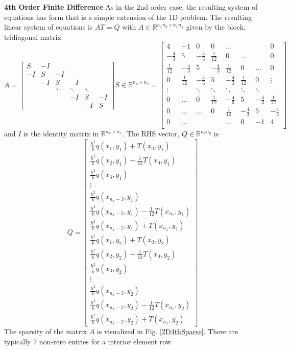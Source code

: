 \documentclass[letterpaper,12pt]{article}
\begin{document}
\textbf{4th Order Finite Difference} As in the 2nd order case, the resulting system of equations has form that is a simple extension of the 1D problem.
The resulting linear system of equations is $AT = Q$ with $A \in \mathbb{R}^{n_xn_y \times n_xn_y}$ given by the block, tridiagonal matrix
\[
A = 
\begin{bmatrix}
S & -I & &\\
-I & S & -I & \\
 & -I & S & -I \\
 & & \ddots & \ddots & \ddots \\
 & & & -I & S & -I \\
 & & & & -I & S
\end{bmatrix}
S \in \mathbb{R}^{n_x \times n_x} =
\begin{bmatrix}
4 & -1 & 0 & 0 & \dots & & & 0 \\
-\frac{4}{3} & 5 & -\frac{4}{3} & \frac{1}{12} & 0 & \dots & & 0\\
\frac{1}{12} & -\frac{4}{3} & 5 & -\frac{4}{3} & \frac{1}{12} & 0 & \dots & 0 \\
0 & \frac{1}{12} & -\frac{4}{3} & 5 & - \frac{4}{3} & \frac{1}{12} & 0 & \vdots \\
\vdots &  & \ddots & \ddots & \ddots & \ddots & \ddots & \\
0 & \dots & 0 & \frac{1}{12} & -\frac{4}{3} & 5 & -\frac{4}{3} & \frac{1}{12} \\
0 & \dots & \dots & 0 & \frac{1}{12} & -\frac{4}{3} & 5 & -\frac{4}{3} \\
0 & \dots & & & \dots & 0 & -1 & 4 \\
\end{bmatrix}
\]
and $I$ is the identity matrix in $\mathbb{R}^{n_x \times n_x}$.
The RHS vector, $Q \in \mathbb{R}^{n_x n_y}$ is
\[
Q= 
\begin{bmatrix}
\frac{h^2}{k}q(x_1, y_1) + T(x_0, y_1) \\
\frac{h^2}{k}q(x_2, y_1) - \frac{1}{12} T(x_0, y_1)\\
\frac{h^2}{k}q(x_3, y_1) \\
\vdots \\
\frac{h^2}{k}q(x_{n_x - 3}, y_1) \\
\frac{h^2}{k}q(x_{n_x-2}, y_1) - \frac{1}{12} T(x_{n_x}, y_1) \\
\frac{h^2}{k}q(x_{n_x-2}, y_1) + T(x_{n_x}, y_1) \\
\frac{h^2}{k}q(x_1, y_2) + T(x_0, y_2) \\
\frac{h^2}{k}q(x_2, y_2) - \frac{1}{12} T(x_0, y_2)\\
\frac{h^2}{k}q(x_3, y_2) \\
\vdots \\
\frac{h^2}{k}q(x_{n_x - 3}, y_2) \\
\frac{h^2}{k}q(x_{n_x-2}, y_2) - \frac{1}{12} T(x_{n_x}, y_2) \\
\frac{h^2}{k}q(x_{n_x-2}, y_2) + T(x_{n_x}, y_2)
\end{bmatrix}
\]
The sparsity of the matrix $A$ is visualized in Fig. \ref{2D4thSparse}. There are typically 7 non-zero entries for a interior element row
\end{document}
